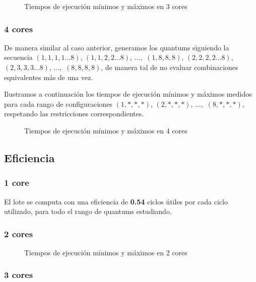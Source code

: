 \documentclass[a4paper,10pt,twoside]{article}
\begin{document}
\begin{figure}[H]
	\centering
	
	\caption{Tiempos de ejecución mínimos y máximos en 3 cores}
\end{figure}


\subsubsection{4 cores}

De manera similar al caso anterior, generamos los quantums siguiendo la secuencia $(1, 1, 1, 1 \ldots 8)$, $(1, 1, 2, 2 \ldots 8)$, $\ldots ,$ $(1, 8, 8, 8)$, $(2, 2, 2, 2 \ldots 8)$, $(2, 3, 3, 3 \ldots 8)$, $\ldots ,$ $(8, 8, 8, 8)$, de manera tal de no evaluar combinaciones equivalentes más de una vez.

Ilustramos a continuación los tiempos de ejecución mínimos y máximos medidos para cada rango de configuraciones $(1, *, *, *)$, $(2, *, *, *)$, $\ldots ,$ $(8, *, *, *)$, respetando las restricciones correspondientes.

\begin{figure}[H]
	\centering
	
	\caption{Tiempos de ejecución mínimos y máximos en 4 cores}
\end{figure}


\subsection{Eficiencia}

\subsubsection{1 core}

El lote se computa con una eficiencia de \textbf{0.54} ciclos útiles por cada ciclo utilizado, para todo el rango de quantums estudiando.


\subsubsection{2 cores}

\begin{figure}[H]
	\centering
	
	\caption{Tiempos de ejecución mínimos y máximos en 2 cores}
\end{figure}


\subsubsection{3 cores}
\end{document}
